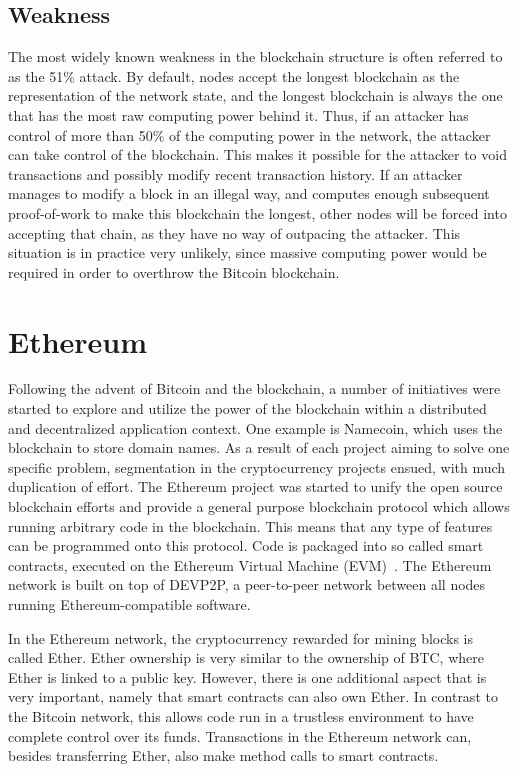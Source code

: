 \subsection{Weakness}
The most widely known weakness in the blockchain structure is often referred to as the 51\% attack. By default, nodes accept the longest blockchain as the representation of the network state, and the longest blockchain is always the one that has the most raw computing power behind it. Thus, if an attacker has control of more than 50\% of the computing power in the network, the attacker can take control of the blockchain. This makes it possible for the attacker to void transactions and possibly modify recent transaction history. If an attacker manages to modify a block in an illegal way, and computes enough subsequent proof-of-work to make this blockchain the longest, other nodes will be forced into accepting that chain, as they have no way of outpacing the attacker. This situation is in practice very unlikely, since massive computing power would be required in order to overthrow the Bitcoin blockchain.

\section{Ethereum}
Following the advent of Bitcoin and the blockchain, a number of initiatives were started to explore and utilize the power of the blockchain within a distributed and decentralized application context. One example is Namecoin, which uses the blockchain to store domain names. As a result of each project aiming to solve one specific problem, segmentation in the cryptocurrency projects ensued, with much duplication of effort. The Ethereum project was started to unify the open source blockchain efforts and provide a general purpose blockchain protocol which allows running arbitrary code in the blockchain. This means that any type of features can be programmed onto this protocol. Code is packaged into so called smart contracts, executed on the Ethereum Virtual Machine (EVM)~\cite{ethereum:white}. The Ethereum network is built on top of DEVP2P, a peer-to-peer network between all nodes running Ethereum-compatible software.

In the Ethereum network, the cryptocurrency rewarded for mining blocks is called Ether. Ether ownership is very similar to the ownership of BTC, where Ether is linked to a public key. However, there is one additional aspect that is very important, namely that smart contracts can also own Ether. In contrast to the Bitcoin network, this allows code run in a trustless environment to have complete control over its funds. Transactions in the Ethereum network can, besides transferring Ether, also make method calls to smart contracts.

